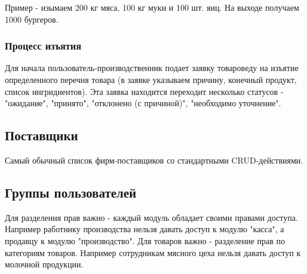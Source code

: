 \documentclass[DIV=calc, paper=a4, fontsize=11pt]{scrartcl} %
\begin{document}
Пример - изымаем 200 кг мяса, 100 кг муки и 100 шт. яиц. На выходе получаем 1000 бургеров. 

\subsubsection{Процесс изъятия}

Для начала пользователь-производственник подает заявку товароведу на изъятие определенного перечня товара (в заявке указываем причину, конечный продукт, список ингридиентов). Эта заявка находится переходит несколько статусов - "ожидание", "принято", "отклонено (с причиной)", "необходимо уточнение".

\subsection{Поставщики}

Самый обычный список фирм-поставщиков со стандартными CRUD-действиями.

\subsection{Группы пользователей}

Для разделения прав важно - каждый модуль обладает своими правами доступа. Например работнику производства нельзя давать доступ к модулю "касса", а продавцу к модулю "производство".
Для товаров важно - разделение прав по категориям товаров. Например сотрудникам мясного цеха нельзя давать доступ к молочной продукции.
\end{document}
